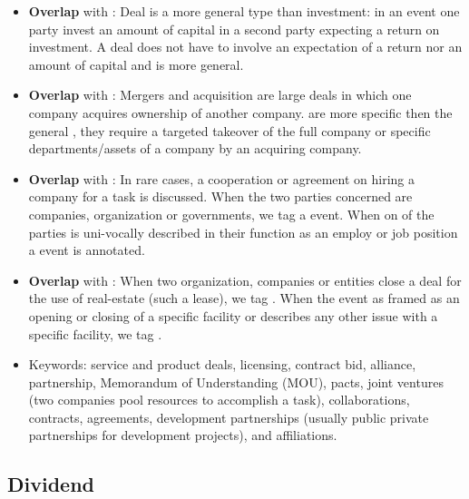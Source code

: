 \begin{itemize}[noitemsep,leftmargin=*]
	\item \hypertarget{dealvsinvestment}{\textbf{Overlap} with : Deal is a more general type than investment: in an  event one party invest an amount of capital in a second party expecting a return on investment. A deal does not have to involve an expectation of a return nor an amount of capital and is more general.}
	\item \hypertarget{dealvsmergeracquisition}{\textbf{Overlap} with : Mergers and acquisition are large deals in which one company acquires ownership of another company.  are more specific then the general , they require a targeted takeover of the full company or specific departments/assets of a company by an acquiring company.}
	\item \hypertarget{dealvsemployment}{\textbf{Overlap} with : In rare cases, a cooperation or agreement on hiring a company for a task is discussed. When the two parties concerned are companies, organization or governments, we tag a  event. When on of the parties is uni-vocally described in their function as an employ or job position a  event is annotated.}
	\item \hypertarget{dealvsfacility}{\textbf{Overlap} with : When two organization, companies or entities close a deal for the use of real-estate (such a lease), we tag . When the event as framed as an opening or closing of a specific facility or describes any other issue with a specific facility, we tag .}
    \item Keywords: service and product deals, licensing, contract bid, alliance, partnership, Memorandum of Understanding (MOU), pacts, joint ventures (two companies pool resources to accomplish a task), collaborations, contracts, agreements, development partnerships (usually public private partnerships for development projects), and affiliations.
\end{itemize}

\vspace{0.5cm}


\subsection{Dividend}

